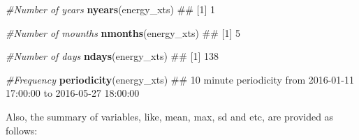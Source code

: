 \documentclass[]{article}
\newenvironment{Shaded}{\begin{snugshade}}{\end{snugshade}}
\newcommand{\KeywordTok}[1]{\textcolor[rgb]{0.13,0.29,0.53}{\textbf{#1}}}
\newcommand{\CommentTok}[1]{\textcolor[rgb]{0.56,0.35,0.01}{\textit{#1}}}
\newcommand{\NormalTok}[1]{#1}
\begin{document}
\begin{Shaded}
\begin{Highlighting}[]
\CommentTok{#Number of years}
\KeywordTok{nyears}\NormalTok{(energy_xts)}
\NormalTok{## [1] 1}

\CommentTok{#Number of mounths}
\KeywordTok{nmonths}\NormalTok{(energy_xts)}
\NormalTok{## [1] 5}

\CommentTok{#Number of days}
\KeywordTok{ndays}\NormalTok{(energy_xts)}
\NormalTok{## [1] 138}

\CommentTok{#Frequency}
\KeywordTok{periodicity}\NormalTok{(energy_xts)}
\NormalTok{## 10 minute periodicity from 2016-01-11 17:00:00 to 2016-05-27 18:00:00}
\end{Highlighting}
\end{Shaded}

Also, the summary of variables, like, mean, max, sd and etc, are
provided as follows:
\end{document}
